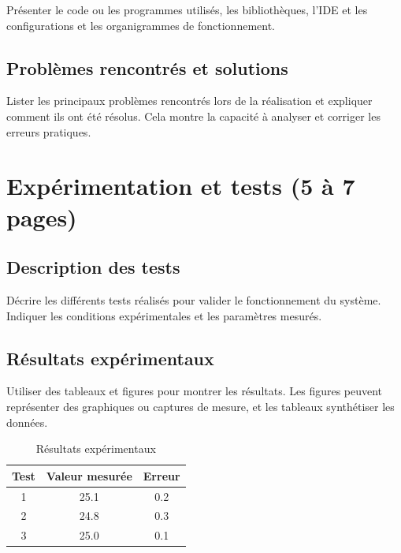 Présenter le code ou les programmes utilisés, les bibliothèques, l’IDE et les configurations et les organigrammes de fonctionnement. 

\subsection{Problèmes rencontrés et solutions}

Lister les principaux problèmes rencontrés lors de la réalisation et expliquer comment ils ont été résolus. Cela montre la capacité à analyser et corriger les erreurs pratiques.

\section{Expérimentation et tests (5 à 7 pages)}


\subsection{Description des tests}

Décrire les différents tests réalisés pour valider le fonctionnement du système. Indiquer les conditions expérimentales et les paramètres mesurés.

\subsection{Résultats expérimentaux}

Utiliser des tableaux et figures pour montrer les résultats. Les figures peuvent représenter des graphiques ou captures de mesure, et les tableaux synthétiser les données.

\begin{table}[h]
	\centering
	\caption{Résultats expérimentaux}
	\begin{tabular}{ccc}
		\toprule
		Test & Valeur mesurée & Erreur \\
		\midrule
		1 & 25.1 & 0.2 \\
		2 & 24.8 & 0.3 \\
		3 & 25.0 & 0.1 \\
		\bottomrule
	\end{tabular}
	\label{tab:Résultats}
\end{table}

